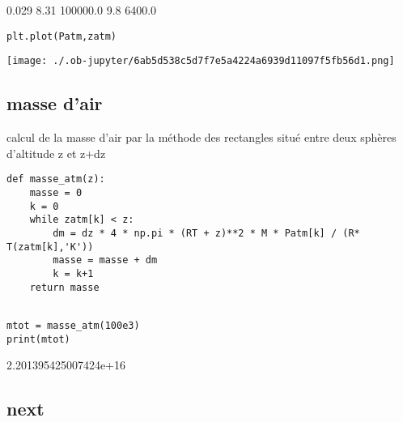 \documentclass[11pt]{article}
\begin{document}
0.029 8.31 100000.0 9.8 6400.0

\begin{verbatim}
plt.plot(Patm,zatm)
\end{verbatim}

\begin{center}
\texttt{[image: ./.ob-jupyter/6ab5d538c5d7f7e5a4224a6939d11097f5fb56d1.png]}
\end{center}


\subsection{masse d'air}
\label{sec:orged4df8d}

calcul de la masse d'air par la méthode des rectangles
situé entre deux sphères d'altitude z et z+dz

\begin{verbatim}
def masse_atm(z):
    masse = 0
    k = 0
    while zatm[k] < z:
        dm = dz * 4 * np.pi * (RT + z)**2 * M * Patm[k] / (R* T(zatm[k],'K'))
        masse = masse + dm
        k = k+1
    return masse
\end{verbatim}

\begin{verbatim}

mtot = masse_atm(100e3)
print(mtot)

\end{verbatim}

2.201395425007424e+16

\subsection{next}
\label{sec:org29b6aa9}
\end{document}
